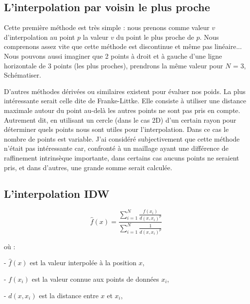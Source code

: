 
\subsection{L'interpolation par voisin le plus proche}
Cette première méthode est très simple : nous prenons comme valeur \( v \) d'interpolation au point \( p \) la valeur \( v \) du point le plus proche de \( p \).
Nous comprenons assez vite que cette méthode est discontinue et même pas linéaire...
Nous pouvons aussi imaginer que 2 points à droit et à gauche d'une ligne horizontale de 3 points (les plus proches), prendrons la même valeur pour \( N \) = 3, Schématiser. 

D'autres méthodes dérivées ou similaires existent pour évaluer nos poids. La plus intéressante serait celle dite de Franke-Littke. Elle consiste à utiliser une distance maximale autour du point au-delà les autres points ne sont pas pris en compte. Autrement dit, en utilisant un cercle (dans le cas 2D) d'un certain rayon pour déterminer quels points nous sont utiles pour l'interpolation. Dans ce cas le nombre de points est variable.
J'ai considéré subjectivement que cette méthode n'était pas intéressante car, confronté à un maillage ayant une différence de raffinement intrinsèque importante, dans certains cas aucuns points ne seraient pris, et dans d'autres, une grande somme serait calculée.

\subsection{L'interpolation IDW}
\[
\hat{f}(x) = \frac{\sum_{i=1}^{N} \frac{f(x_i)}{d(x, x_i)^p}}{\sum_{i=1}^{N} \frac{1}{d(x, x_i)^p}}
\]

où :

- \(\hat{f}(x)\) est la valeur interpolée à la position \(x\),

- \(f(x_i)\) est la valeur connue aux points de données \(x_i\),

- \(d(x, x_i)\) est la distance entre \(x\) et \(x_i\),

